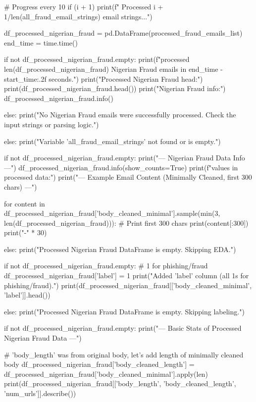\begin{ffcode}
        # Progress every 10%
        if (i + 1) %
            print(f"  Processed {i + 1}/{len(all_fraud_email_strings)} email strings...")

    df_processed_nigerian_fraud = pd.DataFrame(processed_fraud_emails_list)
    end_time = time.time()

    if not df_processed_nigerian_fraud.empty:
        print(f"\nSuccessfully processed {len(df_processed_nigerian_fraud)} Nigerian Fraud emails in {end_time - start_time:.2f} seconds.")
        print("Processed Nigerian Fraud head:")
        print(df_processed_nigerian_fraud.head())
        print("\nProcessed Nigerian Fraud info:")
        df_processed_nigerian_fraud.info()

    else:
        print("No Nigerian Fraud emails were successfully processed. Check the input strings or parsing logic.")

else:
    print("Variable 'all_fraud_email_strings' not found or is empty.")

if not df_processed_nigerian_fraud.empty:
    print("--- Nigerian Fraud Data Info ---")
    df_processed_nigerian_fraud.info(show_counts=True)
    print(f"\nMissing values in processed data:")
    print("\n--- Example Email Content (Minimally Cleaned, first 300 chars) ---")

    for content in df_processed_nigerian_fraud['body_cleaned_minimal'].sample(min(3, len(df_processed_nigerian_fraud))):
        # Print first 300 chars
        print(content[:300])
        print("-" * 30)

else:
    print("Processed Nigerian Fraud DataFrame is empty. Skipping EDA.")

if not df_processed_nigerian_fraud.empty:
    # 1 for phishing/fraud
    df_processed_nigerian_fraud['label'] = 1
    print("Added 'label' column (all 1s for phishing/fraud).")
    print(df_processed_nigerian_fraud[['body_cleaned_minimal', 'label']].head())

else:
    print("Processed Nigerian Fraud DataFrame is empty. Skipping labeling.")

if not df_processed_nigerian_fraud.empty:
    print("--- Basic Stats of Processed Nigerian Fraud Data ---")

    # 'body_length' was from original body, let's add length of minimally cleaned body
    df_processed_nigerian_fraud['body_cleaned_length'] = df_processed_nigerian_fraud['body_cleaned_minimal'].apply(len)
    print(df_processed_nigerian_fraud[['body_length', 'body_cleaned_length', 'num_urls']].describe())


\end{ffcode}
